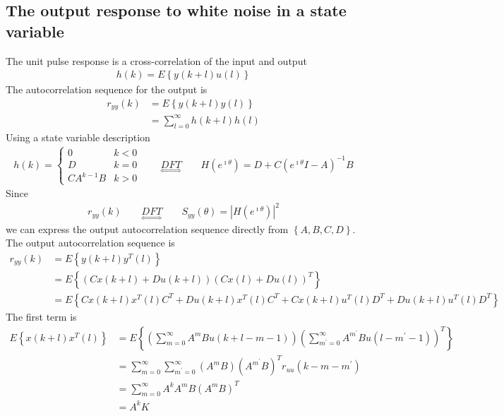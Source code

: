 \documentclass[a4paper,twoside,10pt,english]{report}
\begin{document}
\subsection{The output response to white noise in a state variable}
The unit pulse response is a cross-correlation of the input and output
\begin{align*}
h\left(k\right) = E\left\{y\left(k+l\right)u\left(l\right)\right\}
\end{align*}
The autocorrelation sequence for the output is 
\begin{align*}
r_{yy}\left(k\right) &= E\left\{y\left(k+l\right)y\left(l\right)\right\}\\
 &= \sum_{l=0}^{\infty}h\left(k+l\right)h\left(l\right)
\end{align*}
Using a state variable description
\begin{align*}
h\left(k\right) =
\begin{cases}
0 & k<0\\
D & k=0\\
CA^{k-1}B & k>0
\end{cases} \quad\quad \underset{\Leftrightarrow}{DFT} \quad\quad
H\left(e^{\imath\theta}\right)=D+C\left(e^{\imath\theta}I-A\right)^{-1}B
\end{align*}
Since
\begin{align*}
r_{yy}\left(k\right) \quad\quad \underset{\Leftrightarrow}{DFT} \quad\quad
S_{yy}\left(\theta\right)=\left|H\left(e^{\imath\theta}\right)\right|^{2}
\end{align*}
we can express the output autocorrelation sequence directly from
$\left\{A,B,C,D\right\}$.
The output autocorrelation sequence is
\begin{align*}
r_{yy}\left(k\right) &= E\left\{y\left(k+l\right)y^{T}\left(l\right)\right\}\\
 &= E\left\{\left(Cx\left(k+l\right)+Du\left(k+l\right)\right)\left(Cx\left(l\right)+Du\left(l\right)\right)^{T}\right\}\\
 &= E\left\{Cx\left(k+l\right)x^{T}\left(l\right)C^{T}+Du\left(k+l\right)x^{T}\left(l\right)C^{T}+Cx\left(k+l\right)u^{T}\left(l\right)D^{T}+Du\left(k+l\right)u^{T}\left(l\right)D^{T}\right\}
\end{align*}
The first term is
\begin{align*}
E\left\{x\left(k+l\right)x^{T}\left(l\right)\right\} &= 
E\left\{\left(\sum_{m=0}^{\infty}A^{m}Bu\left(k+l-m-1\right)\right)
\left(\sum_{m^{\prime}=0}^{\infty}A^{m^{\prime}}
Bu\left(l-m^{\prime}-1\right)\right)^{T}\right\}\\
 &= \sum_{m=0}^{\infty}\sum_{m^{\prime}=0}^{\infty}
\left(A^{m}B\right)\left(A^{m^{\prime}}B\right)^{T}r_{uu}\left(k-m-m^{\prime}\right)\\
 &= \sum_{m=0}^{\infty}A^{k}A^{m}B\left(A^{m}B\right)^{T}\\
 &= A^{k}K
\end{align*}
\end{document}
